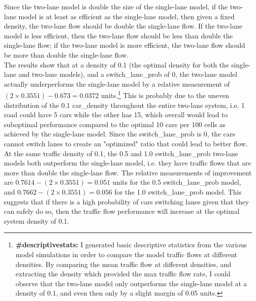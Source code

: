 \documentclass[11pt]{article}
\begin{document}
Since the two-lane model is double the size of the single-lane model, if
the two-lane model is at least as efficient as the single-lane model,
then given a fixed density, the two-lane flow should be double the
single-lane flow. If the two-lane model is less efficient, then the
two-lane flow should be less than double the single-lane flow; if the
two-lane model is more efficient, the two-lane flow should be more than
double the single-lane flow.\\

The results show that at a density of 0.1 (the optimal density for both
the single-lane and two-lane models), and a switch\_lane\_prob of 0, the
two-lane model actually underperforms the single-lane model by a
relative measurement of \((2 \times 0.3551) - 0.673 = 0.0372\) units.\footnote{\textbf{\#descriptivestats: }I generated basic descriptive statistics from the various model simulations in order to compare the model traffic flows at different densities. By comparing the mean traffic flow at different densities, and extracting the density which provided the max traffic flow rate, I could observe that the two-lane model only outperforms the single-lane model at a density of 0.1, and even then only by a slight margin of 0.05 units.} This is probably due to the uneven distribution of the 0.1 car\_density
throughout the entire two-lane system, i.e. 1 road could have 5 cars
while the other has 15, which overall would lead to suboptimal
performance compared to the optimal 10 cars per 100 cells as achieved by
the single-lane model. Since the switch\_lane\_prob is 0, the cars
cannot switch lanes to create an "optimized" ratio that could lead to
better flow.\\

At the same traffic density of 0.1, the 0.5 and 1.0 switch\_lane\_prob
two-lane models both outperform the single-lane model, i.e. they have
traffic flows that are more than double the single-lane flow. The
relative measurements of improvement are
\(0.7614 - (2 \times 0.3551)= 0.051\) units for the 0.5
switch\_lane\_prob model, and \(0.7662 - (2 \times 0.3551)= 0.056\) for
the 1.0 switch\_lane\_prob model. This suggests that if there is a high
probability of cars switching lanes given that they can safely do so,
then the traffic flow performance will increase at the optimal system
density of 0.1.\\
\end{document}
